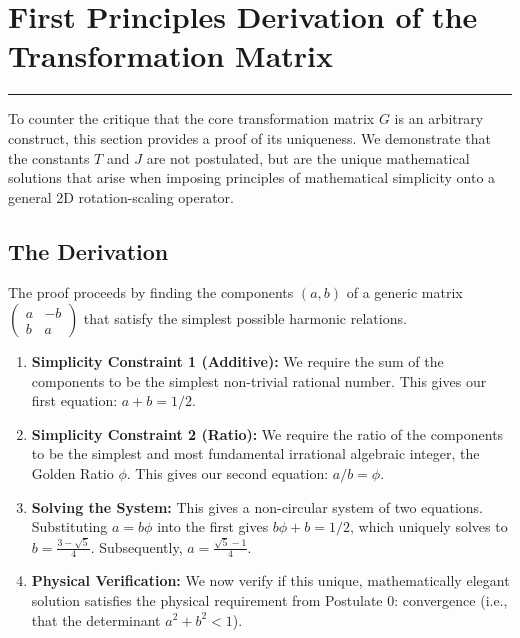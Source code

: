 



\section{First Principles Derivation of the Transformation Matrix}
\label{sec:fortify_g_matrix}
\hrule
\vspace{1em}
To counter the critique that the core transformation matrix $G$ is an arbitrary construct, this section provides a proof of its uniqueness. We demonstrate that the constants $T$ and $J$ are not postulated, but are the unique mathematical solutions that arise when imposing principles of mathematical simplicity onto a general 2D rotation-scaling operator.

\subsection*{The Derivation}
The proof proceeds by finding the components $(a,b)$ of a generic matrix $\begin{pmatrix} a & -b \\ b & a \end{pmatrix}$ that satisfy the simplest possible harmonic relations.
\begin{enumerate}
    \item \textbf{Simplicity Constraint 1 (Additive):} We require the sum of the components to be the simplest non-trivial rational number. This gives our first equation: $a+b=1/2$.
    
    \item \textbf{Simplicity Constraint 2 (Ratio):} We require the ratio of the components to be the simplest and most fundamental irrational algebraic integer, the Golden Ratio $\phi$. This gives our second equation: $a/b = \phi$.

    \item \textbf{Solving the System:} This gives a non-circular system of two equations. Substituting $a=b\phi$ into the first gives $b\phi + b = 1/2$, which uniquely solves to $b = \frac{3-\sqrt{5}}{4}$. Subsequently, $a = \frac{\sqrt{5}-1}{4}$.
    
    \item \textbf{Physical Verification:} We now verify if this unique, mathematically elegant solution satisfies the physical requirement from Postulate 0: convergence (i.e., that the determinant $a^2+b^2 < 1$).
\end{enumerate}


